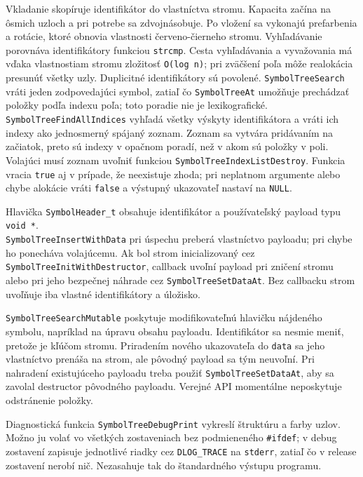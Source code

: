 \documentclass[11pt,a4paper]{article}
\begin{document}
  Vkladanie skopíruje identifikátor do vlastníctva stromu. Kapacita začína na
  ôsmich uzloch a pri potrebe sa zdvojnásobuje. Po vložení sa vykonajú
  prefarbenia a rotácie, ktoré obnovia vlastnosti červeno-čierneho stromu.
  Vyhľadávanie porovnáva identifikátory funkciou \texttt{strcmp}. Cesta
  vyhľadávania a vyvažovania má vďaka vlastnostiam stromu zložitosť
  \texttt{O(log n)}; pri zväčšení poľa môže realokácia presunúť všetky uzly.
  Duplicitné identifikátory sú povolené. \texttt{SymbolTreeSearch} vráti
  jeden zodpovedajúci symbol, zatiaľ čo \texttt{SymbolTreeAt} umožňuje
  prechádzať položky podľa indexu poľa; toto poradie nie je lexikografické.
  \texttt{SymbolTreeFindAllIndices} vyhľadá všetky výskyty identifikátora a
  vráti ich indexy ako jednosmerný spájaný zoznam. Zoznam sa vytvára
  pridávaním na začiatok, preto sú indexy v opačnom poradí, než v akom sú
  položky v poli. Volajúci musí zoznam uvoľniť funkciou
  \texttt{SymbolTreeIndexListDestroy}. Funkcia vracia \texttt{true} aj v
  prípade, že neexistuje zhoda; pri neplatnom argumente alebo chybe alokácie
  vráti \texttt{false} a výstupný ukazovateľ nastaví na \texttt{NULL}.

  Hlavička \texttt{SymbolHeader\_t} obsahuje identifikátor a používateľský
  payload typu \texttt{void *}. \\ \texttt{SymbolTreeInsertWithData} pri úspechu
  preberá vlastníctvo payloadu; pri chybe ho ponecháva volajúcemu. Ak bol
  strom inicializovaný cez \texttt{SymbolTreeInitWithDestructor}, callback
  uvoľní payload pri zničení stromu alebo pri jeho bezpečnej náhrade cez
  \texttt{SymbolTreeSetDataAt}. Bez callbacku strom uvoľňuje iba vlastné
  identifikátory a úložisko.

  \texttt{SymbolTreeSearchMutable} poskytuje modifikovateľnú hlavičku
  nájdeného symbolu, napríklad na úpravu obsahu payloadu. Identifikátor sa
  nesmie meniť, pretože je kľúčom stromu. Priradením nového ukazovateľa do
  \texttt{data} sa jeho vlastníctvo prenáša na strom, ale pôvodný payload sa
  tým neuvoľní. Pri nahradení existujúceho payloadu treba použiť
  \texttt{SymbolTreeSetDataAt}, aby sa zavolal destructor pôvodného payloadu.
  Verejné API momentálne neposkytuje odstránenie položky.

  Diagnostická funkcia \texttt{SymbolTreeDebugPrint} vykreslí štruktúru a
  farby uzlov. Možno ju volať vo všetkých zostaveniach bez podmieneného
  \texttt{\#ifdef}; v debug zostavení zapisuje jednotlivé riadky cez
  \texttt{DLOG\_TRACE} na \texttt{stderr}, zatiaľ čo v release zostavení
  nerobí nič. Nezasahuje tak do štandardného výstupu programu.
\end{document}
